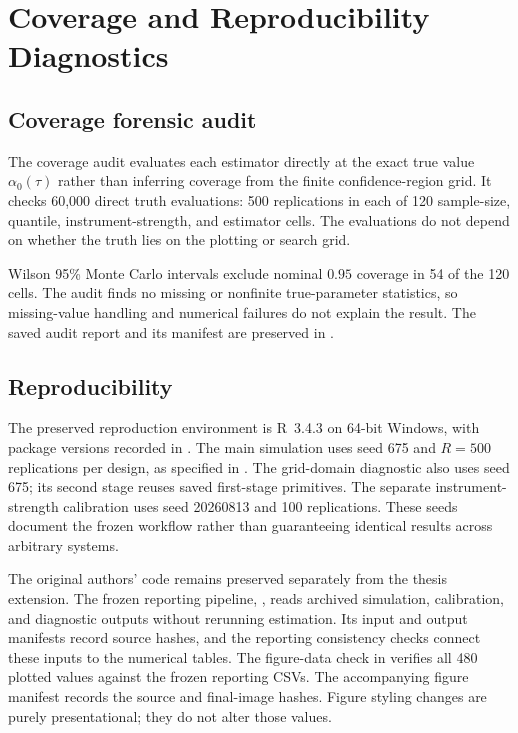 \section{Coverage and Reproducibility Diagnostics}
\label{app:coverage-reproducibility}

\subsection{Coverage forensic audit}
The coverage audit evaluates each estimator directly at the exact true value $\alpha_0(\tau)$ rather than inferring coverage from the finite confidence-region grid. It checks 60,000 direct truth evaluations: 500 replications in each of 120 sample-size, quantile, instrument-strength, and estimator cells. The evaluations do not depend on whether the truth lies on the plotting or search grid.

Wilson 95\% Monte Carlo intervals exclude nominal $0.95$ coverage in 54 of the 120 cells. The audit finds no missing or nonfinite true-parameter statistics, so missing-value handling and numerical failures do not explain the result. The saved audit report and its manifest are preserved in .

\subsection{Reproducibility}
The preserved reproduction environment is R~3.4.3 on 64-bit Windows, with package versions recorded in . The main simulation uses seed 675 and $R=500$ replications per design, as specified in . The grid-domain diagnostic also uses seed 675; its second stage reuses saved first-stage primitives. The separate instrument-strength calibration uses seed 20260813 and 100 replications. These seeds document the frozen workflow rather than guaranteeing identical results across arbitrary systems.

The original authors' code remains preserved separately from the thesis extension. The frozen reporting pipeline, , reads archived simulation, calibration, and diagnostic outputs without rerunning estimation. Its input and output manifests record source hashes, and the reporting consistency checks connect these inputs to the numerical tables. The figure-data check in  verifies all 480 plotted values against the frozen reporting CSVs. The accompanying figure manifest records the source and final-image hashes. Figure styling changes are purely presentational; they do not alter those values.
